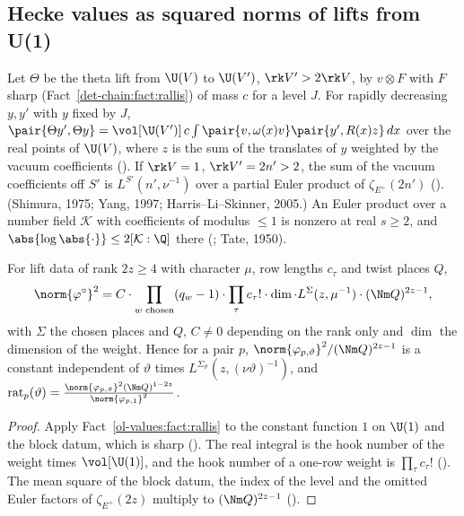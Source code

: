 \subsection{Hecke values as squared norms of lifts from U(1)}

\begin{fact}\label{ol-values:fact:rallis}
Let $\Theta$ be the theta lift from $\U(V)$ to $\U(V')$, $\rk V'>2\rk V$, by $v\otimes F$ with $F$
sharp (Fact~\ref{det-chain:fact:rallis}) of mass $c$ for a level $J$. For rapidly decreasing $y,y'$ with $y$ fixed by $J$,
$\pair{\Theta y',\Theta y}=\vol[\U(V')]\,c\int\pair{v,\omega(x)v}\pair{y',R(x)z}\,dx$ over the real
points of $\U(V)$, where $z$ is the sum of the translates of $y$ weighted by the vacuum
coefficients (). If $\rk V=1$,
$\rk V'=2n'>2$, the sum of the vacuum coefficients off $S'$ is $L^{S'}(n',\nu^{-1})$ over a partial
Euler product of $\zeta_{E^+}(2n')$ (). (Shimura, 1975; Yang,
1997; Harris--Li--Skinner, 2005.) An Euler product over a number field $\mathcal K$ with coefficients of
modulus $\le1$ is nonzero at real $s\ge2$, and $\abs{\log\abs{\cdot}}\le2[\mathcal K:\Q]$ there
(; Tate, 1950).
\end{fact}

\begin{proposition}\label{ol-values:prop:rallis}
For lift data of rank $2z\ge4$ with character $\mu$, row lengths $c_\tau$ and twist places $Q$,
\[
\norm{\varphi^\circ}^2=C\cdot\prod_{w\text{ chosen}}(q_w-1)\cdot\prod_\tau c_\tau!\cdot\dim\cdot
L^{\Sigma}(z,\mu^{-1})\cdot(\Nm Q)^{2z-1},
\]
with $\Sigma$ the chosen places and $Q$, $C\ne0$ depending on the rank only and $\dim$ the dimension of the weight. Hence for a pair
$p$, $\norm{\varphi_{p,\vartheta}}^2/(\Nm Q)^{2z-1}$ is a constant independent of $\vartheta$ times
$L^{\Sigma_\vartheta}(z,(\nu\vartheta)^{-1})$, and
$\mathrm{rat}_p(\vartheta)=\frac{\norm{\varphi_{p,\vartheta}}^2(\Nm Q)^{1-2z}}{\norm{\varphi_{p,1}}^2}$.
\end{proposition}

\begin{proof}
Apply Fact~\ref{ol-values:fact:rallis} to the constant function $1$ on $\U(1)$ and the block
datum, which is sharp (). The real integral is the hook
number of the weight times $\vol[\U(1)]$, and the hook number of a one-row weight is
$\prod_\tau c_\tau!$ (). The mean square of the
block datum, the index of the level and the omitted Euler factors of $\zeta_{E^+}(2z)$ multiply to
$(\Nm Q)^{2z-1}$ ().
\end{proof}

